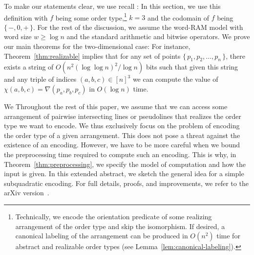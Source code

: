 \ifeurocg\else
To make our statements clear, we use recall :
%
\DefinitionEncoding*
%
In this section, we use this definition with \(f\) being some order
type,\footnote{%
  Technically, we encode the orientation predicate of some realizing
  arrangement of the order type and skip the isomorphism. If desired, a
  canonical labeling of the arrangement can be produced in \(O(n^2)\) time for
  abstract and realizable order types (see Lemma~\ref{lem:canonical-labeling}).
}
\(k=3\) and the codomain of \(f\) being \(\{\, -,0,+\,\}\). For the rest of the
discussion, we assume the word-RAM model with word size \(w \geq \log n\) and
the standard arithmetic and bitwise operators.
%
We prove our main theorems for the two-dimensional case:
%
\TheoremGPTAbstract*
\TheoremGPTRealizable*
\TheoremGPTPreprocessing*
%
For instance, Theorem~\ref{thm:realizable} implies that for any set of points
\(\{\, p_1, p_2, \ldots, p_n\,\}\), there exists a string of \(O(n^2 {(\log
\log n)}^2 / \log n)\) bits such that given this string and any triple of
indices \((a,b,c) \in {[n]}^3\) we can compute the value of \(\chi(a,b,c) =
\nabla(p_a, p_b, p_c)\) in \(O(\log n)\) time.
\fi

\ifeurocg
We \else
Throughout the rest of this paper, we \fi
assume that we can access some arrangement of pairwise intersecting lines or
pseudolines that realizes the order type we want to encode. We thus exclusively
focus on the problem of encoding the order type of a given arrangement. This
does not pose a threat against the existence of an encoding.
\ifeurocg\else%
However, we have to be more careful when we bound the preprocessing
time required to compute such an encoding. This is why, in
Theorem~\ref{thm:preprocessing}, we specify the model of computation and how
the input is given.
\fi%
\ifeurocg%
In this extended abstract, we sketch the general idea for a simple subquadratic
encoding. For full details, proofs, and improvements, we refer to the arXiv
version~\cite{CCILO18}.
\fi%
